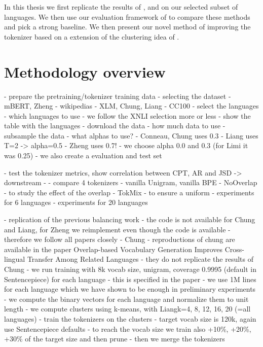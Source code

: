 In this thesis we first replicate the results of \citet{chung_improving_2020}, \citet{zheng_allocating_2021} and \citet{liang_xlm-v_2023} on our selected subset of languages. We then use our evaluation framework of \citet{limisiewicz_tokenization_2023} to compare these methods and pick a strong baseline. We then present our novel method of improving the tokenizer based on a extension of the clustering idea of \citet{chung_improving_2020}.

\section{Methodology overview}

- prepare the pretraining/tokenizer training data
    - selecting the dataset
        - mBERT, Zheng - wikipedias
        - XLM, Chung, Liang - CC100 
    - select the languages
        - which languages to use
        - we follow the XNLI selection more or less
        - show the table with the languages
    - download the data
        - how much data to use
    - subsample the data
        - what alphas to use?
            - Conneau, Chung uses 0.3 
            - Liang uses T=2 -> alpha=0.5
            - Zheng uses 0.7!
        - we choose alpha 0.0 and 0.3 (for Limi it was 0.25)
        - we also create a evaluation and test set


- test the tokenizer metrics, show correlation between CPT, AR and JSD -> downstream
    - 
    - compare 4 tokenizers
        - vanilla Unigram, vanilla BPE
        - NoOverlap - to study the effect of the overlap
        - TokMix - to ensure a uniform 
    - experiments for 6 languages
    - experiments for 20 languages


- replication of the previous balancing work
    - the code is not available for Chung and Liang, for Zheng we reimplement even though the code is available
    - therefore we follow all papers closely
    - Chung
        - reproductions of chung are available in the paper Overlap-based Vocabulary Generation Improves Cross-lingual Transfer Among Related Languages
            - they do not replicate the results of Chung
        - we run training with 8k vocab size, unigram, coverage 0.9995 (default in Sentencepiece) for each language
            - this is specified in the paper
            - we use 1M lines for each language which we have shown to be enough in preliminary experiments
        - we compute the binary vectors for each language and normalize them to unit length
        - we compute clusters using k-means, with Liangk=4, 8, 12, 16, 20 (=all languages)
        - train the tokenizers on the clusters
            - target vocab size is 120k, again use Sentencepiece defaults
            - to reach the vocab size we train also +10\%, +20\%, +30\% of the target size and then prune
        - then we merge the tokenizers

